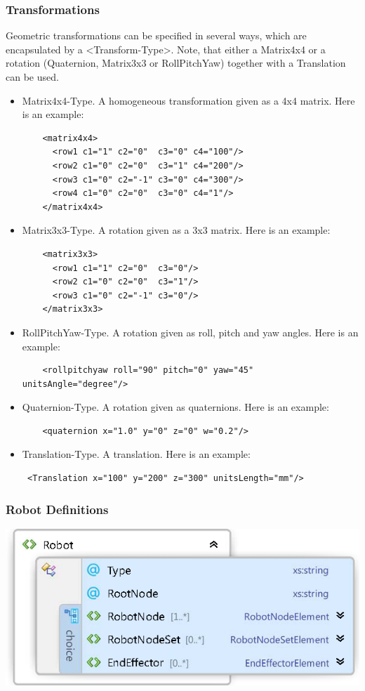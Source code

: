 \subsubsection*{Transformations}
Geometric transformations can be specified in several ways, which are encapsulated by a <Transform-Type>. Note, that either a Matrix4x4 or a rotation (Quaternion, Matrix3x3 or RollPitchYaw) together with a Translation can be used. 
\begin{itemize}
\item Matrix4x4-Type. A homogeneous transformation given as a 4x4 matrix. Here is an example:
\begin{lstlisting}
    <matrix4x4>
      <row1 c1="1" c2="0"  c3="0" c4="100"/>
      <row2 c1="0" c2="0"  c3="1" c4="200"/>
      <row3 c1="0" c2="-1" c3="0" c4="300"/>
      <row4 c1="0" c2="0"  c3="0" c4="1"/>
    </matrix4x4>
\end{lstlisting}
\item Matrix3x3-Type. A rotation given as a 3x3 matrix. Here is an example: 
\begin{lstlisting}
    <matrix3x3>
      <row1 c1="1" c2="0"  c3="0"/>
      <row2 c1="0" c2="0"  c3="1"/>
      <row3 c1="0" c2="-1" c3="0"/>
    </matrix3x3>
\end{lstlisting}
\item RollPitchYaw-Type. A rotation given as roll, pitch and yaw angles. Here is an example: 
\begin{lstlisting}
    <rollpitchyaw roll="90" pitch="0" yaw="45" unitsAngle="degree"/>
\end{lstlisting}
\item Quaternion-Type. A rotation given as quaternions. Here is an example: 
\begin{lstlisting}
    <quaternion x="1.0" y="0" z="0" w="0.2"/>
\end{lstlisting}
\item Translation-Type. A translation. Here is an example: 
\begin{lstlisting}
 <Translation x="100" y="200" z="300" unitsLength="mm"/>
\end{lstlisting}
\end{itemize}
\subsubsection{Robot Definitions}
\includegraphics[width=\textwidth]{Xsd_Robot}
